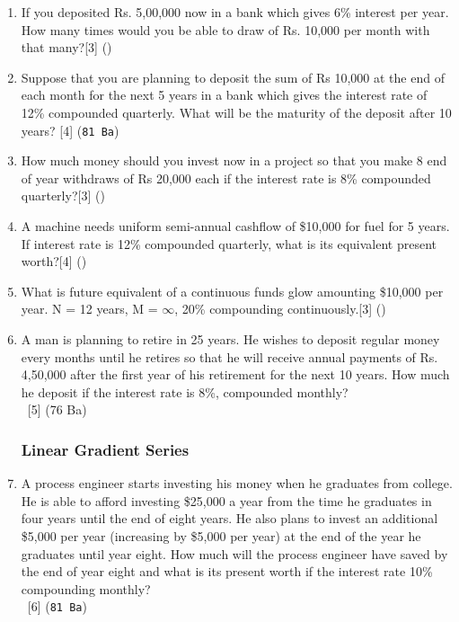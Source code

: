 \documentclass[12pt]{article}
\newcommand{\enter}{\\\textcolor{white}{1}}
\begin{document}
\begin{enumerate}[noitemsep, topsep=0pt]
			\item If you deposited Rs. 5,00,000 now in a bank which gives 6\% interest per year. How many times would you be able to draw of Rs. 10,000 per month with that many?\hfill[3] ()
	
			\item Suppose that you are planning to deposit the sum of Rs 10,000 at the end of each month for the next 5 years in a bank which gives the interest rate of 12\% compounded quarterly. What will be the maturity of the deposit after 10 years? \hfill[4] (\texttt{81 Ba})

			\item How much money should you invest now in a project so that you make 8 end of year withdraws of Rs 20,000 each if the interest rate is 8\% compounded quarterly?\hfill[3] ()

			\item A machine needs uniform semi-annual cashflow of \$10,000 for fuel for 5 years. If interest rate is 12\% compounded quarterly, what is its equivalent present worth?\hfill[4] ()

			\item What is future equivalent of a continuous funds glow amounting \$10,000 per year. N = 12 years, M = $\infty$, 20\% compounding continuously.\hfill[3] ()

			\item A man is planning to retire in 25 years. He wishes to deposit regular money every months until he retires so that he will receive annual payments of Rs. 4,50,000 after the first year of his retirement for the next 10 years. How much he deposit if the interest rate is 8\%, compounded monthly?
			\enter\hfill[5] (76 Ba)
	
		\subsubsection{Linear Gradient Series}

			\item A process engineer starts investing his money when he graduates from college. He is able to afford investing \$25,000 a year from the time he graduates in four years until the end of eight years. He also plans to invest an additional \$5,000 per year (increasing by \$5,000 per year) at the end of the year he graduates until year eight. How much will the process engineer have saved by the end of year eight and what is its present worth if the interest rate 10\% compounding monthly?
			\enter\hfill [6] (\texttt{81 Ba})


\end{enumerate}
\end{document}
